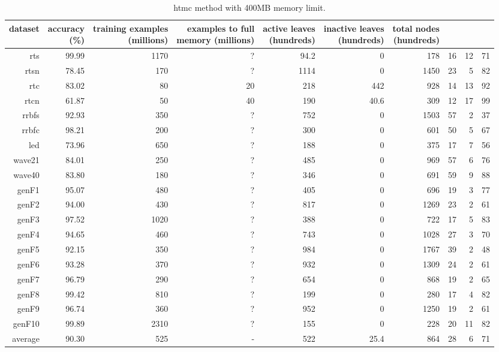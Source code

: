 \clearpage
\begin{table}
\caption{{\sc htmc} method with 400MB memory limit.}
\label{tab:htmc-400MB}
\centering
\begin{tabular}{|r|r|r|r|r|r|r|r|r|r|}
\hline
dataset	&
\rotatebox{90}{\parbox{9em}{accuracy\\(\%)}} &
\rotatebox{90}{\parbox{9em}{training examples\\(millions)}} &
\rotatebox{90}{\parbox{9em}{examples to full\\memory (millions)}} &
\rotatebox{90}{\parbox{9em}{active leaves\\(hundreds)}} &
\rotatebox{90}{\parbox{9em}{inactive leaves\\(hundreds)}} &
\rotatebox{90}{\parbox{9em}{total nodes\\(hundreds)}} &
\rotatebox{90}{\parbox{9em}{tree depth}}	&
\rotatebox{90}{\parbox{9em}{training speed (\%)}} &
\rotatebox{90}{\parbox{9em}{prediction speed (\%)}} \\
\hline
{\sc rts} & 99.99 & 1170 & ? & 94.2 & 0 & 178 & 16 & 12 & 71 \\
{\sc rtsn} & 78.45 & 170 & ? & 1114 & 0 & 1450 & 23 & 5 & 82 \\
{\sc rtc} & 83.02 & 80 & 20 & 218 & 442 & 928 & 14 & 13 & 92 \\
{\sc rtcn} & 61.87 & 50 & 40 & 190 & 40.6 & 309 & 12 & 17 & 99 \\
{\sc rrbfs} & 92.93 & 350 & ? & 752 & 0 & 1503 & 57 & 2 & 37 \\
{\sc rrbfc} & 98.21 & 200 & ? & 300 & 0 & 601 & 50 & 5 & 67 \\
{\sc led} & 73.96 & 650 & ? & 188 & 0 & 375 & 17 & 7 & 56 \\
{\sc wave21} & 84.01 & 250 & ? & 485 & 0 & 969 & 57 & 6 & 76 \\
{\sc wave40} & 83.80 & 180 & ? & 346 & 0 & 691 & 59 & 9 & 88 \\
{\sc genF1} & 95.07 & 480 & ? & 405 & 0 & 696 & 19 & 3 & 77 \\
{\sc genF2} & 94.00 & 430 & ? & 817 & 0 & 1269 & 23 & 2 & 61 \\
{\sc genF3} & 97.52 & 1020 & ? & 388 & 0 & 722 & 17 & 5 & 83 \\
{\sc genF4} & 94.65 & 460 & ? & 743 & 0 & 1028 & 27 & 3 & 70 \\
{\sc genF5} & 92.15 & 350 & ? & 984 & 0 & 1767 & 39 & 2 & 48 \\
{\sc genF6} & 93.28 & 370 & ? & 932 & 0 & 1309 & 24 & 2 & 61 \\
{\sc genF7} & 96.79 & 290 & ? & 654 & 0 & 868 & 19 & 2 & 65 \\
{\sc genF8} & 99.42 & 810 & ? & 199 & 0 & 280 & 17 & 4 & 82 \\
{\sc genF9} & 96.74 & 360 & ? & 952 & 0 & 1250 & 19 & 2 & 61 \\
{\sc genF10} & 99.89 & 2310 & ? & 155 & 0 & 228 & 20 & 11 & 82 \\
\hline
average & 90.30 & 525 &  -  & 522 & 25.4 & 864 & 28 & 6 & 71 \\
\hline
\end{tabular}
\end{table}
